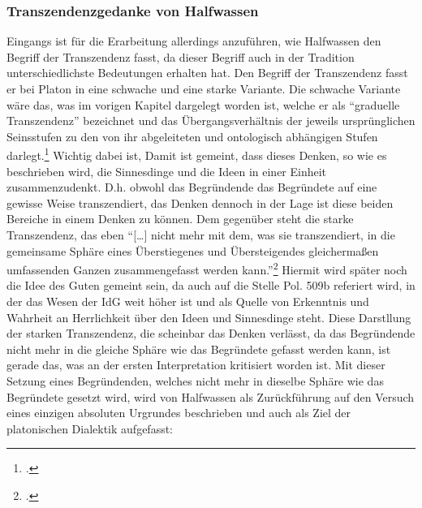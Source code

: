\subsubsection{Transzendenzgedanke von Halfwassen}
Eingangs ist für die Erarbeitung allerdings anzuführen, wie Halfwassen den Begriff der Transzendenz fasst, da dieser Begriff auch in der Tradition unterschiedlichste Bedeutungen erhalten hat. Den Begriff der Transzendenz fasst er bei Platon in eine schwache und eine starke Variante. Die schwache Variante wäre das, was im vorigen Kapitel dargelegt worden ist, welche er als \enquote{graduelle Transzendenz} bezeichnet und das Übergangsverhältnis der jeweils ursprünglichen Seinsstufen zu den von ihr abgeleiteten und ontologisch abhängigen Stufen darlegt.\footcite[vgl.][S. 29]{halfwassen2015spuren} Wichtig dabei ist,  Damit ist gemeint, dass dieses Denken, so wie es beschrieben wird, die Sinnesdinge und die Ideen in einer Einheit zusammenzudenkt. D.h. obwohl das Begründende das Begründete auf eine gewisse Weise transzendiert, das Denken dennoch in der Lage ist diese beiden Bereiche in einem Denken zu können.
Dem gegenüber steht die starke Transzendenz, das eben \enquote{[\dots] nicht mehr mit dem, was sie transzendiert, in die gemeinsame Sphäre eines Überstiegenes und Übersteigendes gleichermaßen umfassenden Ganzen zusammengefasst werden kann.}\footcite[vgl.][S. 29]{halfwassen2015spuren} Hiermit wird später noch die Idee des Guten gemeint sein, da auch auf die Stelle Pol. 509b referiert wird, in der das Wesen der IdG weit höher ist und als Quelle von Erkenntnis und Wahrheit an Herrlichkeit über den Ideen und Sinnesdinge steht.
Diese Darstllung der starken Transzendenz, die scheinbar das Denken verlässt, da das Begründende nicht mehr in die gleiche Sphäre wie das Begründete gefasst werden kann, ist gerade das, was an der ersten Interpretation kritisiert worden ist. 
Mit dieser Setzung eines Begründenden, welches nicht mehr in dieselbe Sphäre wie das Begründete gesetzt wird, wird von Halfwassen als Zurückführung auf den Versuch eines einzigen absoluten Urgrundes beschrieben und auch als Ziel der platonischen Dialektik aufgefasst:
